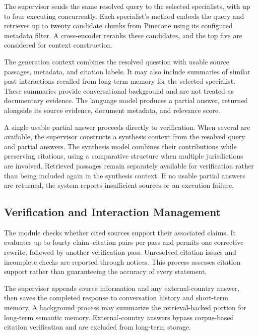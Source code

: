 \documentclass[a4paper,12pt]{report}
\begin{document}
The supervisor sends the same resolved query to the selected
specialists, with up to four executing concurrently. Each
specialist's  method embeds the query and retrieves
up to twenty candidate chunks from Pinecone using its configured
metadata filter. A cross-encoder reranks these candidates, and
the top five are considered for context construction.

The generation context combines the resolved question with usable
source passages, metadata, and citation labels. It may also include
summaries of similar past interactions recalled from long-term
memory for the selected specialist. These summaries provide
conversational background and are not treated as documentary
evidence. The language model produces a partial answer, returned
alongside its source evidence, document metadata, and relevance
score.

A single usable partial answer proceeds directly to verification.
When several are available, the supervisor constructs a synthesis
context from the resolved query and partial answers. The synthesis
model combines their contributions while preserving citations,
using a comparative structure when multiple jurisdictions are
involved. Retrieved passages remain separately available for
verification rather than being included again in the synthesis
context. If no usable partial answers are returned, the system
reports insufficient sources or an execution failure.

\subsection{Verification and Interaction Management}

The  module checks whether cited
sources support their associated claims. It evaluates up to fourty 
claim--citation pairs per pass and permits one corrective rewrite,
followed by another verification pass. Unresolved citation issues
and incomplete checks are reported through notices. This process
assesses citation support rather than guaranteeing the accuracy
of every statement.

The supervisor appends source information and any external-country
answer, then saves the completed response to conversation history
and short-term memory. A background process may summarize the
retrieval-backed portion for long-term semantic memory.
External-country answers bypass corpus-based citation verification
and are excluded from long-term storage.
\end{document}
